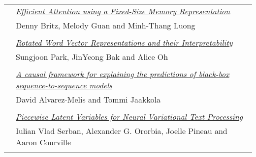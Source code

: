 \begin{tabular}{p{20mm}p{128mm}}
 & \hyperlink{page.390}{\em Efficient Attention using a Fixed-Size Memory Representation}\\
         & Denny Britz, Melody Guan and Minh-Thang Luong \\
\\

 & \hyperlink{page.399}{\em Rotated Word Vector Representations and their Interpretability}\\
         & Sungjoon Park, JinYeong Bak and Alice Oh \\
\\

 & \hyperlink{page.410}{\em A causal framework for explaining the predictions of black-box sequence-to-sequence models}\\
         & David Alvarez-Melis and Tommi Jaakkola \\
\\

 & \hyperlink{page.420}{\em Piecewise Latent Variables for Neural Variational Text Processing}\\
         & Iulian Vlad Serban, Alexander G. Ororbia, Joelle Pineau and Aaron Courville \\
\\

\end{tabular}
\newpage
